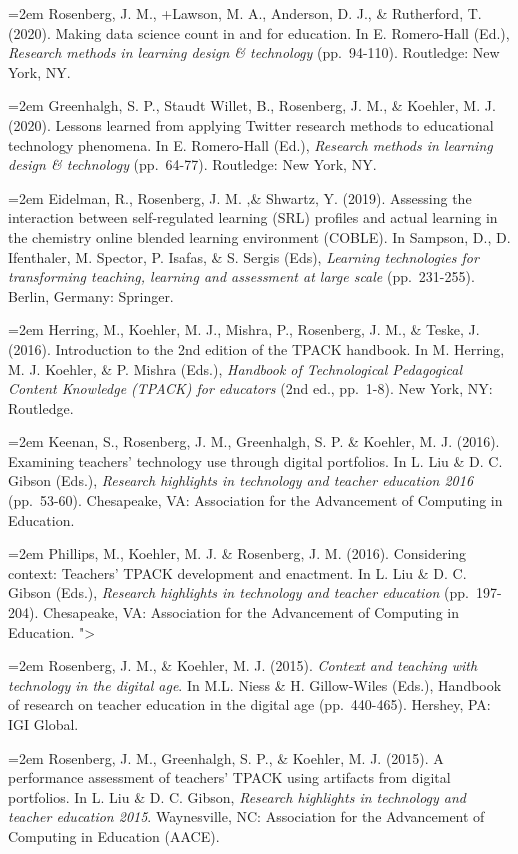 \documentclass[
  14,
]{article}
\begin{document}
\hangindent=2em Rosenberg, J. M., +Lawson, M. A., Anderson, D. J., \&
Rutherford, T. (2020). Making data science count in and for education.
In E. Romero-Hall (Ed.), \emph{Research methods in learning design \&
technology} (pp.~94-110). Routledge: New York, NY.

\hangindent=2em Greenhalgh, S. P., Staudt Willet, B., Rosenberg, J. M.,
\& Koehler, M. J. (2020). Lessons learned from applying Twitter research
methods to educational technology phenomena. In E. Romero-Hall (Ed.),
\emph{Research methods in learning design \& technology} (pp.~64-77).
Routledge: New York, NY.

\hangindent=2em Eidelman, R., Rosenberg, J. M. ,\& Shwartz, Y. (2019).
Assessing the interaction between self-regulated learning (SRL) profiles
and actual learning in the chemistry online blended learning environment
(COBLE). In Sampson, D., D. Ifenthaler, M. Spector, P. Isafas, \& S.
Sergis (Eds), \emph{Learning technologies for transforming teaching,
learning and assessment at large scale} (pp.~231-255). Berlin, Germany:
Springer.

\hangindent=2em Herring, M., Koehler, M. J., Mishra, P., Rosenberg, J.
M., \& Teske, J. (2016). Introduction to the 2nd edition of the TPACK
handbook. In M. Herring, M. J. Koehler, \& P. Mishra (Eds.),
\emph{Handbook of Technological Pedagogical Content Knowledge (TPACK)
for educators} (2nd ed., pp.~1-8). New York, NY: Routledge.

\hangindent=2em Keenan, S., Rosenberg, J. M., Greenhalgh, S. P. \&
Koehler, M. J. (2016). Examining teachers' technology use through
digital portfolios. In L. Liu \& D. C. Gibson (Eds.), \emph{Research
highlights in technology and teacher education 2016} (pp.~53-60).
Chesapeake, VA: Association for the Advancement of Computing in
Education.

\hangindent=2em Phillips, M., Koehler, M. J. \& Rosenberg, J. M. (2016).
Considering context: Teachers' TPACK development and enactment. In L.
Liu \& D. C. Gibson (Eds.), \emph{Research highlights in technology and
teacher education} (pp.~197-204). Chesapeake, VA: Association for the
Advancement of Computing in Education. "\textgreater{}

\hangindent=2em Rosenberg, J. M., \& Koehler, M. J. (2015).
\emph{Context and teaching with technology in the digital age}. In M.L.
Niess \& H. Gillow-Wiles (Eds.), Handbook of research on teacher
education in the digital age (pp.~440-465). Hershey, PA: IGI Global.

\hangindent=2em Rosenberg, J. M., Greenhalgh, S. P., \& Koehler, M. J.
(2015). A performance assessment of teachers' TPACK using artifacts from
digital portfolios. In L. Liu \& D. C. Gibson, \emph{Research highlights
in technology and teacher education 2015}. Waynesville, NC: Association
for the Advancement of Computing in Education (AACE).
\end{document}
